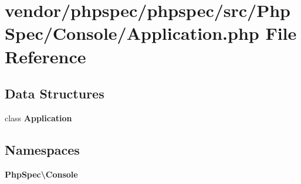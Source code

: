 \section{vendor/phpspec/phpspec/src/\+Php\+Spec/\+Console/\+Application.php File Reference}
\label{phpspec_2phpspec_2src_2_php_spec_2_console_2_application_8php}
\subsection*{Data Structures}
\begin{DoxyCompactItemize}
\item 
class {\bf Application}
\end{DoxyCompactItemize}
\subsection*{Namespaces}
\begin{DoxyCompactItemize}
\item 
 {\bf Php\+Spec\textbackslash{}\+Console}
\end{DoxyCompactItemize}
